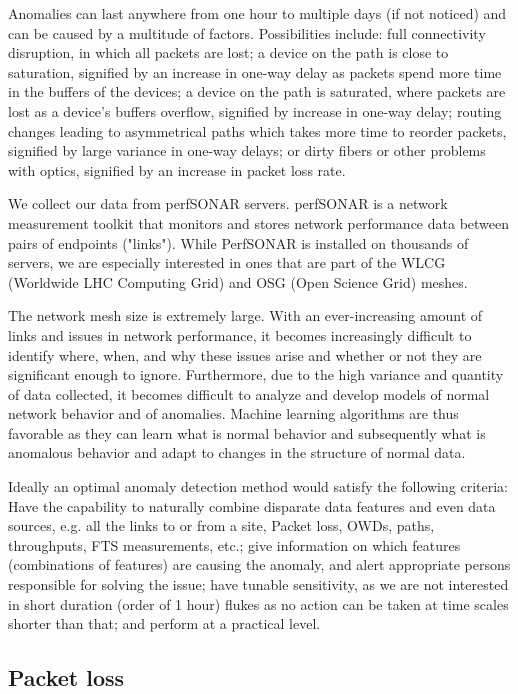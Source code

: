 \documentclass[5p]{elsarticle}
\begin{document}
Anomalies can last anywhere from one hour to multiple days (if not noticed) and can be caused by a multitude of factors. Possibilities include: full connectivity disruption, in which all packets are lost; a device on the path is close to saturation, signified by an increase in one-way delay as packets spend more time in the buffers of the devices; a device on the path is saturated, where packets are lost as a device’s buffers overflow, signified by increase in one-way delay; routing changes leading to asymmetrical paths which takes more time to reorder packets, signified by large variance in one-way delays; or dirty fibers or other problems with optics, signified by an increase in packet loss rate.

We collect our data from perfSONAR \cite{jedan} servers. perfSONAR is a network measurement toolkit that monitors and stores network performance data between pairs of endpoints ("links"). While PerfSONAR is installed on thousands of servers, we are especially interested in ones that are part of the WLCG (Worldwide LHC Computing Grid) and OSG (Open Science Grid) meshes.

The network mesh size is extremely large. With an ever-increasing amount of links and issues in network performance, it becomes increasingly difficult to identify where, when, and why these issues arise and whether or not they are significant enough to ignore. Furthermore, due to the high variance and quantity of data collected, it becomes difficult to analyze and develop models of normal network behavior and of anomalies. Machine learning algorithms are thus favorable as they can learn what is normal behavior and subsequently what is anomalous behavior and adapt to changes in the structure of normal data.

Ideally an optimal anomaly detection method would satisfy the following criteria: Have the capability to naturally combine disparate data features and even data sources, e.g. all the links to or from a site, Packet loss, OWDs, paths, throughputs, FTS measurements, etc.; give information on which features (combinations of features) are causing the anomaly, and alert appropriate persons responsible for solving the issue; have tunable sensitivity, as we are not interested in short duration (order of 1 hour) flukes as no action can be taken at time scales shorter than that; and perform at a practical level.

\subsection{Packet loss}
\end{document}
